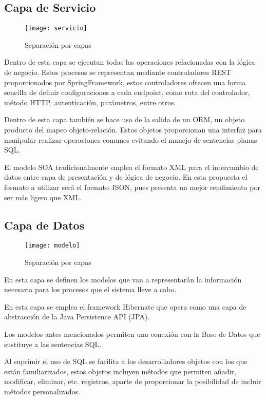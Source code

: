 \subsection{Capa de Servicio}

\begin{figure}[H]
  \begin{center}
    \texttt{[image: servicio]}
  \end{center}
  \caption{Separación por capas}
\end{figure}

Dentro de esta capa se ejecutan todas las operaciones relacionadas con la lógica de negocio. Estos procesos se representan mediante controladores REST proporcionados por SpringFramework, estos controladores ofrecen una forma sencilla de definir configuraciones a cada endpoint, como ruta del controlador, método HTTP, autenticación, parámetros, entre otros.

Dentro de esta capa también se hace uso de la salida de un ORM, un objeto producto del mapeo objeto-relación. Estos objetos proporcionan una interfaz para manipular realizar operaciones comunes evitando el manejo de sentencias planas SQL.

El modelo SOA tradicionalmente emplea el formato XML para el intercambio de datos entre capa de presentación y de lógica de negocio. En esta propuesta el formato a utilizar será el formato JSON, pues presenta un mejor rendimiento por ser más ligero que XML.

\subsection{Capa de Datos}

\begin{figure}[H]
  \begin{center}
    \texttt{[image: modelo]}
  \end{center}
  \caption{Separación por capas}
\end{figure}

En esta capa se definen los modelos que van a representarán la información necesaria para los procesos que el sistema lleve a cabo.

En esta capa se emplea el framework Hibernate que opera como una capa de abstracción de la Java Persistence API (JPA).

Los modelos antes mencionados permiten una conexión con la Base de Datos que sustituye a las sentencias SQL. 

Al suprimir el uso de SQL se facilita a los desarrolladores objetos con los que están familiarizados, estos objetos incluyen métodos que permiten añadir, modificar, eliminar, etc. registros, aparte de proporcionar la posibilidad de incluir métodos personalizados.
